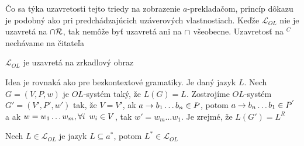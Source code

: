 \begin{dokaz}
    Čo sa týka uzavretosti tejto triedy na zobrazenie $a$-prekladačom,
    princíp dôkazu je podobný ako pri predchádzajúcich uzáverových
    vlastnostiach. Keďže $\mathcal{L}_{OL}$ nie je uzavretá na
    $\cap\mathcal{R}$, tak nemôže byť uzavretá ani na $\cap$
    všeobecne. Uzavretosť na $^{C}$ nechávame na čitateľa
\end{dokaz}

\begin{veta}
    $\mathcal{L}_{OL}$ je uzavretá na zrkadlový obraz
\end{veta}

\begin{dokaz}
    Idea je rovnaká ako pre bezkontextové gramatiky. Je daný jazyk
    $L$. Nech $G=(V,P,w)$ je $OL$-systém taký, že $L(G)=L$. Zostrojíme
    $OL$-systém $G'=(V',P',w')$ tak, že $V=V'$, ak $a\rightarrow b_{1}\dots
    b_{n}\in P$, potom $a\rightarrow b_{n}\dots b_{1}\in P^{'}$ a ak
    $w=w_{1}\dots w_{m},\forall i\enspace w_i\in V$, tak $w'=w_{m}\dots
    w_{1}$. Je zrejmé, že $L(G')=L^{R}$
\end{dokaz}

\begin{veta}
    Nech $L\in\mathcal{L}_{OL}$ je jazyk $L\subseteq a^{*}$, potom
    $L^{*}\in\mathcal{L}_{OL}$
\end{veta}

